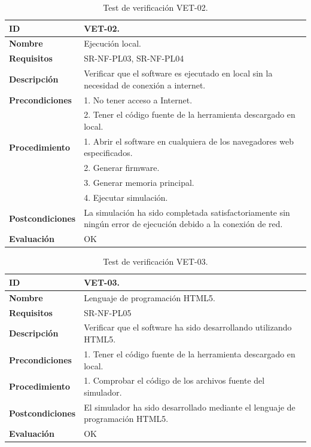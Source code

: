 \begin{center}
\begin{table}[htb]
\centering
\begin{tabular}{@{}p{2.5cm} p{13cm}@{}} 
\toprule
\textbf{ID} 					& VET-02. \\
\midrule
\textbf{Nombre} 				& Ejecución local. \\
\midrule
\textbf{Requisitos} 		& SR-NF-PL03, SR-NF-PL04\\
\midrule
\textbf{Descripción} 		& Verificar que el software es ejecutado en local sin la necesidad de conexión a internet. \\
\midrule
\textbf{Precondiciones}		& 1. No tener acceso a Internet.\\
											& 2. Tener el código fuente de la herramienta descargado en local.\\
\midrule
\textbf{Procedimiento}			& 1. Abrir el software en cualquiera de los navegadores web especificados. \\
							& 2. Generar firmware.\\
							& 3. Generar memoria principal.\\
							& 4. Ejecutar simulación.\\
\midrule
\textbf{Postcondiciones} 		&  La simulación ha sido completada satisfactoriamente sin ningún error de ejecución debido a la conexión de red.\\
\midrule
\textbf{Evaluación} 			& OK \\
\bottomrule
\end{tabular}
\caption{Test de verificación VET-02.}
\label{tab:vet02}
\end{table}
\end{center}

\begin{center}
\begin{table}[htb]
\centering
\begin{tabular}{@{}p{2.5cm} p{13cm}@{}} 
\toprule
\textbf{ID} 					& VET-03. \\
\midrule
\textbf{Nombre} 				& Lenguaje de programación HTML5. \\
\midrule
\textbf{Requisitos} 		& SR-NF-PL05\\
\midrule
\textbf{Descripción} 		& Verificar que el software ha sido desarrollando utilizando HTML5. \\
\midrule
\textbf{Precondiciones}		& 1. Tener el código fuente de la herramienta descargado en local. \\
\midrule
\textbf{Procedimiento}		& 1. Comprobar el código de los archivos fuente del simulador.\\
\midrule
\textbf{Postcondiciones} 		&  El simulador ha sido desarrollado mediante el lenguaje de programación HTML5.\\
\midrule
\textbf{Evaluación} 			& OK \\
\bottomrule
\end{tabular}
\caption{Test de verificación VET-03.}
\label{tab:vet03}
\end{table}
\end{center}

